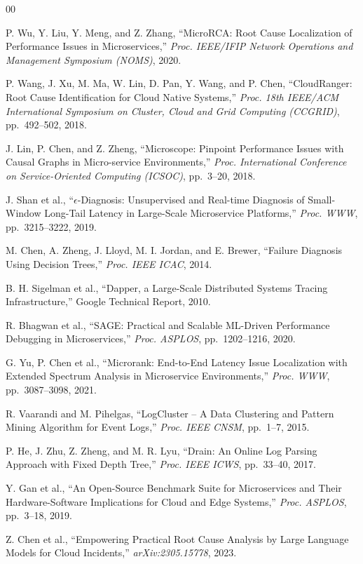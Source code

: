 \documentclass[conference]{IEEEtran}
\begin{document}
\begin{thebibliography}{00}

P. Wu, Y. Liu, Y. Meng, and Z. Zhang, ``MicroRCA: Root Cause Localization of Performance Issues in Microservices,'' \textit{Proc. IEEE/IFIP Network Operations and Management Symposium (NOMS)}, 2020.

P. Wang, J. Xu, M. Ma, W. Lin, D. Pan, Y. Wang, and P. Chen, ``CloudRanger: Root Cause Identification for Cloud Native Systems,'' \textit{Proc. 18th IEEE/ACM International Symposium on Cluster, Cloud and Grid Computing (CCGRID)}, pp.~492--502, 2018.

J. Lin, P. Chen, and Z. Zheng, ``Microscope: Pinpoint Performance Issues with Causal Graphs in Micro-service Environments,'' \textit{Proc. International Conference on Service-Oriented Computing (ICSOC)}, pp.~3--20, 2018.

J. Shan et al., ``$\epsilon$-Diagnosis: Unsupervised and Real-time Diagnosis of Small-Window Long-Tail Latency in Large-Scale Microservice Platforms,'' \textit{Proc. WWW}, pp.~3215--3222, 2019.

M. Chen, A. Zheng, J. Lloyd, M. I. Jordan, and E. Brewer, ``Failure Diagnosis Using Decision Trees,'' \textit{Proc. IEEE ICAC}, 2014.

B. H. Sigelman et al., ``Dapper, a Large-Scale Distributed Systems Tracing Infrastructure,'' Google Technical Report, 2010.

R. Bhagwan et al., ``SAGE: Practical and Scalable ML-Driven Performance Debugging in Microservices,'' \textit{Proc. ASPLOS}, pp.~1202--1216, 2020.

G. Yu, P. Chen et al., ``Microrank: End-to-End Latency Issue Localization with Extended Spectrum Analysis in Microservice Environments,'' \textit{Proc. WWW}, pp.~3087--3098, 2021.

R. Vaarandi and M. Pihelgas, ``LogCluster -- A Data Clustering and Pattern Mining Algorithm for Event Logs,'' \textit{Proc. IEEE CNSM}, pp.~1--7, 2015.

P. He, J. Zhu, Z. Zheng, and M. R. Lyu, ``Drain: An Online Log Parsing Approach with Fixed Depth Tree,'' \textit{Proc. IEEE ICWS}, pp.~33--40, 2017.

Y. Gan et al., ``An Open-Source Benchmark Suite for Microservices and Their Hardware-Software Implications for Cloud and Edge Systems,'' \textit{Proc. ASPLOS}, pp.~3--18, 2019.

Z. Chen et al., ``Empowering Practical Root Cause Analysis by Large Language Models for Cloud Incidents,'' \textit{arXiv:2305.15778}, 2023.

\end{thebibliography}
\end{document}

